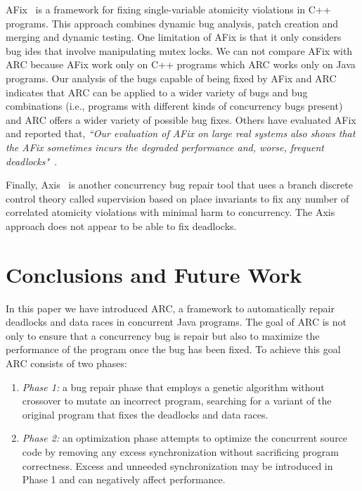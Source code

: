 \documentclass[runningheads,a4paper]{llncs}
\begin{document}
AFix~\cite{JSZL+11} is a framework for fixing single-variable atomicity violations in C++ programs. This approach combines dynamic bug analysis, patch creation and merging and dynamic testing. One limitation of AFix is that it only considers bug ides that involve manipulating mutex locks. We can not compare AFix with ARC because AFix work only on C++ programs which ARC works only on Java programs. Our analysis of the bugs capable of being fixed by AFix and ARC indicates that ARC can be applied to a wider variety of bugs and bug combinations (i.e., programs with different kinds of concurrency bugs present) and ARC offers a wider variety of possible bug fixes. Others have evaluated AFix and reported that, \textit{``Our evaluation of AFix on large real systems also shows that the AFix sometimes incurs the degraded performance and, worse, frequent deadlocks"}~\cite{LZ12}. 

Finally, Axis~\cite{LZ12} is another concurrency bug repair tool that uses a branch discrete control theory called supervision based on place invariants to fix any number of correlated atomicity violations with minimal harm to concurrency. The Axis approach does not appear to be able to fix deadlocks.%

\section{Conclusions and Future Work}
\label{sec:conclusion}

In this paper we have introduced ARC, a framework to automatically repair deadlocks and data races in concurrent Java programs. The goal of ARC is not only to ensure that a concurrency bug is repair but also to maximize the performance of the program once the bug has been fixed. To achieve this goal ARC consists of two phases: 

\begin{enumerate}
\item \emph{Phase 1:} a bug repair phase that employs a genetic algorithm without crossover to mutate an incorrect program, searching for a variant of the original program that fixes the deadlocks and data races.
\item \emph{Phase 2:} an optimization phase attempts to optimize the concurrent source code by removing any excess synchronization without sacrificing program correctness. Excess and unneeded synchronization may be introduced in Phase 1 and can negatively affect performance.
\end{enumerate}
\end{document}
